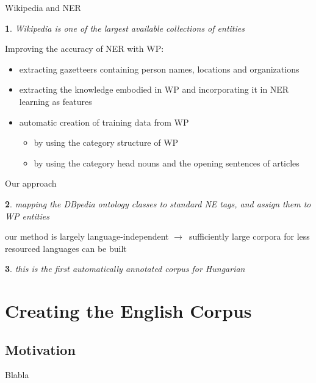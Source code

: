 \documentclass[utf8x]{beamer}
\newcommand{\nyil}{$\rightarrow$\ }
\newtheorem{nix}{}[section]
\begin{document}
\begin{frame}{Wikipedia and NER}

\begin{nix}
Wikipedia is one of the largest available collections of entities
\end{nix}

\smallskip

Improving the accuracy of NER with WP:

\begin{itemize}
\item extracting gazetteers containing person names, locations and organizations 
\item extracting the knowledge embodied in WP and incorporating it in NER learning as features
\item automatic creation of training data from WP
\begin{itemize}
\item by using the category structure of WP
\item by using the category head nouns and the opening sentences of articles
\end{itemize} 
\end{itemize}

\end{frame}

\begin{frame}{Our approach}

\begin{nix}
mapping the DBpedia ontology classes to standard NE tags, and assign them to WP entities
\end{nix}

\bigskip

our method is largely language-independent \nyil sufficiently large corpora for less resourced languages can be built 

\bigskip

\begin{nix}
this is the first automatically annotated corpus for Hungarian 
\end{nix}

\end{frame}

\section{Creating the English Corpus}

\subsection*{Motivation}
\begin{frame}{Blabla}
\end{frame}
\end{document}
